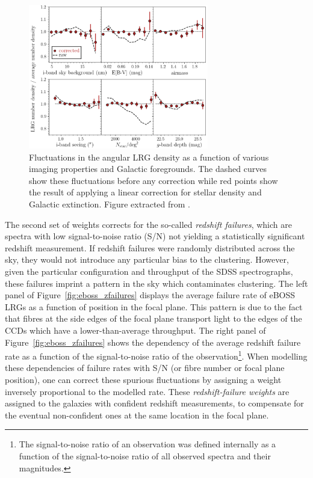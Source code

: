\begin{figure}
    \centering 
    \includegraphics[width=0.7\textwidth]{fig/galaxies/photometric_weights_lrg.png}
    \caption{ Fluctuations in the angular LRG density as a function of 
    various imaging properties and Galactic foregrounds. 
    The dashed curves show these fluctuations before any correction 
    while red points show the result of applying a linear correction for 
    stellar density and Galactic extinction. 
    Figure extracted from \cite{rossCompletedSDSSIVExtended2020}.} 
    \label{fig:photo_systematics_lrg}
\end{figure}

The second set of weights corrects for the so-called \emph{redshift failures}, 
which are spectra with low signal-to-noise ratio (S/N)
not yielding a statistically significant redshift measurement. 
If redshift failures were randomly distributed across the sky, 
they would not introduce any particular bias to the clustering. 
However, given the particular configuration and throughput of the SDSS spectrographs, 
these failures imprint a pattern in the sky which contaminates clustering. 
The left panel of Figure~\ref{fig:eboss_zfailures} displays the average failure rate 
of eBOSS LRGs as a function of position in the focal plane. 
This pattern is due to the fact that fibres at the side edges of the focal plane 
transport light to the edges of the CCDs which have a lower-than-average throughput. 
The right panel of Figure~\ref{fig:eboss_zfailures} shows the 
dependency of the average redshift failure rate as a function of the signal-to-noise
ratio of the observation\footnote{The signal-to-noise ratio of an observation was 
defined internally as a function of the signal-to-noise ratio of all observed 
spectra and their magnitudes.}.
When modelling these dependencies of failure rates with S/N (or fibre number or focal plane
position), one can correct these spurious fluctuations by assigning a weight 
inversely proportional to the modelled rate. 
These \emph{redshift-failure weights} are assigned to the 
galaxies with confident redshift measurements, to compensate for the eventual 
non-confident ones at the same location in the focal plane. 

